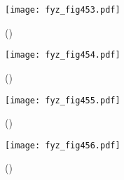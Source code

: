 {    \begin{figure}[ht!] %
      \centering
      \texttt{[image: fyz\_fig453.pdf]}
      \caption{ 
               (\cite[s.~707]{Feynman01})}
      \label{fyz_fig453}
    \end{figure}
    
    \begin{figure}[ht!] %
      \centering
      \texttt{[image: fyz\_fig454.pdf]}
      \caption{ 
               (\cite[s.~707]{Feynman01})}
      \label{fyz_fig454}
    \end{figure}
    
    \begin{figure}[ht!] %
      \centering
      \texttt{[image: fyz\_fig455.pdf]}
      \caption{ 
               (\cite[s.~707]{Feynman01})}
      \label{fyz_fig455}
    \end{figure}
    
    \begin{figure}[ht!] %
      \centering
      \texttt{[image: fyz\_fig456.pdf]}
      \caption{ 
               (\cite[s.~707]{Feynman01})}
      \label{fyz_fig456}
    \end{figure}
    
} %
\printbibliography[title={Seznam literatury}, heading=subbibliography]
